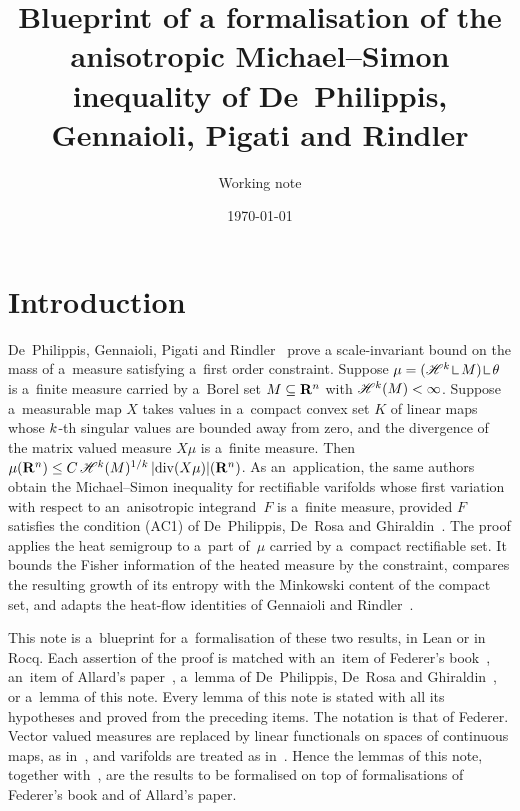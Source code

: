 \documentclass[a4paper,twoside,leqno]{article}
\date{\today}
\title{Blueprint of a formalisation of the anisotropic Michael--Simon inequality of De~Philippis,
    Gennaioli, Pigati and Rindler}
\author{Working note}
\begin{document}
\maketitle

\tableofcontents

\section{Introduction}
\label{sec:intro}

De~Philippis, Gennaioli, Pigati and Rindler~\cite[Theorem~1.1]{DePhilippisGennaioliPigatiRindler2026}
prove a scale-invariant bound on the mass of a~measure satisfying a~first order constraint. Suppose
$\mu = (\HM^{\vdim} \restrict M) \restrict \theta$ is a~finite measure carried by a~Borel set $M
\subseteq \mathbf{R}^{n}$ with $\mathscr{H}^{k}(M) < \infty$. Suppose a~measurable map $X$ takes values in
a~compact convex set $K$ of linear maps whose $k$-th singular values are bounded away from
zero, and the divergence of the matrix valued measure $X\mu$ is a~finite measure. Then
$\mu(\mathbf{R}^{n}) \le C \, \mathscr{H}^{k}(M)^{1/k} \, |\mathrm{div}(X\mu)|(\mathbf{R}^{n})$. As
an~application, the same authors obtain the Michael--Simon inequality for rectifiable varifolds
whose first variation with respect to an~anisotropic integrand~$F$ is a~finite measure, provided
$F$ satisfies the condition (AC1) of De~Philippis, De~Rosa and
Ghiraldin~\cite[Theorem~1.6]{DePhilippisGennaioliPigatiRindler2026}. The proof applies the heat
semigroup to a~part of~$\mu$ carried by a~compact rectifiable set. It bounds the Fisher
information of the heated measure by the constraint, compares the resulting growth of its entropy
with the Minkowski content of the compact set, and adapts the heat-flow identities of Gennaioli
and Rindler~\cite[section~3]{Gennaioli2026}.

This note is a~blueprint for a~formalisation of these two results, in Lean or in Rocq. Each
assertion of the proof is matched with an~item of Federer's book~\cite{Federer1969}, an~item of
Allard's paper~\cite{Allard1972}, a~lemma of De~Philippis, De~Rosa and
Ghiraldin~\cite{DePhilippis2018}, or a~lemma of this note. Every lemma of this note is stated with
all its hypotheses and proved from the preceding items. The notation is that of Federer.
Vector valued measures are replaced by linear functionals on spaces of continuous maps, as
in~\cite[2.5.12, 2.5.14, 4.1.5]{Federer1969}, and varifolds are treated as
in~\cite{Allard1972}. Hence the lemmas of this note, together with~\cite[Lemmas~A.1
and~A.2]{DePhilippis2018}, are the results to be formalised on top of formalisations of
Federer's book and of Allard's paper.
\end{document}
